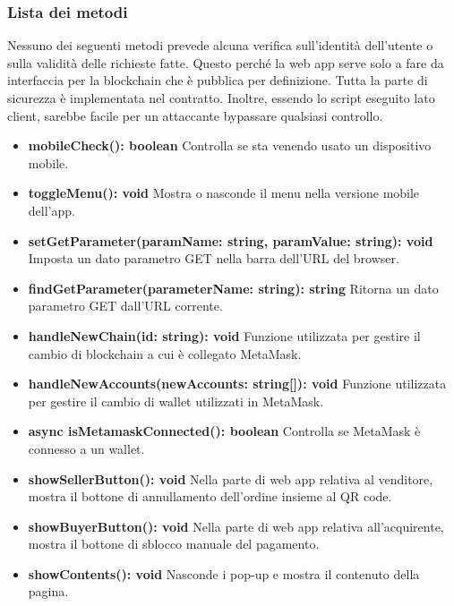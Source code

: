 \documentclass[a4paper, 12pt]{article}
\begin{document}
\subsubsection{Lista dei metodi}
Nessuno dei seguenti metodi prevede alcuna verifica sull'identità dell'utente o sulla validità delle richieste fatte. Questo perché la web app serve solo a fare da interfaccia per la blockchain che è pubblica per definizione. Tutta la parte di sicurezza è implementata nel contratto. Inoltre, essendo lo script eseguito lato client, sarebbe facile per un attaccante bypassare qualsiasi controllo.
\begin{itemize}
    \item \textbf{mobileCheck(): boolean} Controlla se sta venendo usato un dispositivo mobile.\\
    \item \textbf{toggleMenu(): void} Mostra o nasconde il menu nella versione mobile dell'app.\\
    \item \textbf{setGetParameter(paramName: string, paramValue: string): void} Imposta un dato parametro GET nella barra dell'URL del browser.\\
    \item \textbf{findGetParameter(parameterName: string): string} Ritorna un dato parametro GET dall'URL corrente.\\
    \item \textbf{handleNewChain(id: string): void} Funzione utilizzata per gestire il cambio di blockchain a cui è collegato MetaMask.\\
    \item \textbf{handleNewAccounts(newAccounts: string[]): void} Funzione utilizzata per gestire il cambio di wallet utilizzati in MetaMask.\\
    \item \textbf{async isMetamaskConnected(): boolean} Controlla se MetaMask è connesso a un wallet.\\
    \item \textbf{showSellerButton(): void} Nella parte di web app relativa al venditore, mostra il bottone di annullamento dell'ordine insieme al QR code.\\
    \item \textbf{showBuyerButton(): void} Nella parte di web app relativa all'acquirente, mostra il bottone di sblocco manuale del pagamento.\\
    \item \textbf{showContents(): void} Nasconde i pop-up e mostra il contenuto della pagina.\\

\end{itemize}
\end{document}
